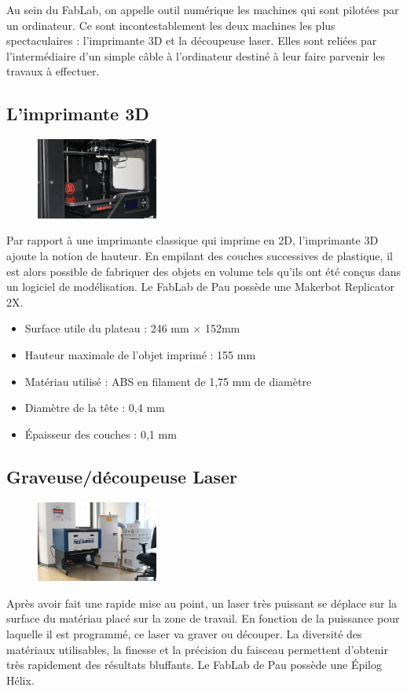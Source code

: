 Au sein du FabLab, on appelle outil numérique les machines qui sont pilotées par un ordinateur. Ce sont incontestablement les deux machines les plus spectaculaires : l'imprimante 3D et la découpeuse laser. Elles sont reliées par l'intermédiaire d'un simple câble à l'ordinateur destiné à leur faire parvenir les travaux à effectuer.
\subsection{L'imprimante 3D}
\begin{figure}
\centering
    \includegraphics[width=40mm]{Makerbot2X.jpg}
    \label{fig:imprimante3D}
\end{figure}

Par rapport à une imprimante classique qui imprime en 2D, l'imprimante 3D ajoute la notion de hauteur. En empilant des couches successives de plastique, il est alors possible de fabriquer des objets en volume tels qu'ils ont été conçus dans un logiciel de modélisation.
Le FabLab de Pau possède une Makerbot Replicator 2X.

\begin{itemize}
  \item Surface utile du plateau : 246 mm $\times$ 152mm
  \item Hauteur maximale de l'objet imprimé : 155 mm
  \item Matériau utilisé : ABS en filament de 1,75 mm de diamètre
  \item Diamètre de la tête : 0,4 mm
  \item Épaisseur des couches : 0,1 mm
\end{itemize}

\subsection{Graveuse/découpeuse Laser}
\begin{figure}
\centering
    \includegraphics[width=40mm]{Epilog.jpg}
    \label{fig:decoupeuselaser}
\end{figure}
Après avoir fait une rapide mise au point, un laser très puissant se déplace sur la surface du matériau placé sur la zone de travail. En fonction de la puissance pour laquelle il est programmé, ce laser va graver ou découper. La diversité des matériaux utilisables, la finesse et la précision du faisceau permettent d'obtenir très rapidement des résultats bluffants.
Le FabLab de Pau possède une Épilog Hélix.

